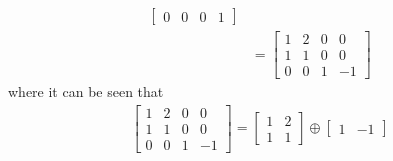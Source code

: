 \begin{solution}
\begin{align*}
\begin{bmatrix}
0 & 0 & 0 & 1
\end{bmatrix}\\
&=
\begin{bmatrix}
1 & 2 & 0 & 0 \\
1 & 1 & 0 & 0 \\
0 & 0 & 1 & -1
\end{bmatrix}
\end{align*}
where it can be seen that
\begin{align*}
\begin{bmatrix}
1 & 2 & 0 & 0 \\
1 & 1 & 0 & 0 \\
0 & 0 & 1 & -1
\end{bmatrix} =
\begin{bmatrix}
1 & 2 \\
1 & 1
\end{bmatrix}
\oplus 
\begin{bmatrix}
1 & -1
\end{bmatrix}
\end{align*}
\end{solution}

